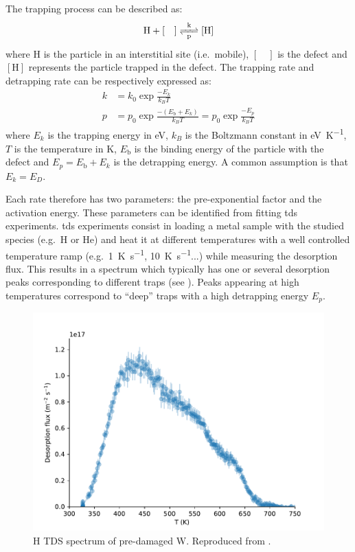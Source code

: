The \gls{trapping} process can be described as:
\begin{equation}
    \ce{H + [\quad] <=>[k][p] [H]}
\end{equation}
where H is the particle in an interstitial site (i.e.\ mobile), $[\quad]$ is the defect and $[\mathrm{H}]$ represents the particle trapped in the defect.
The \gls{trapping} rate and \gls{detrapping} rate can be respectively expressed as:
\begin{align}
    k &= k_0 \exp{\frac{-E_k}{k_B T}} \\
    p &= p_0 \exp{\frac{-(E_\mathrm{b} + E_k)}{k_B T}} = p_0 \exp{\frac{-E_p}{k_B T}}
\end{align}
where $E_k$ is the \gls{trapping} energy in \si{eV}, $k_B$ is the Boltzmann constant in \si{eV.K^{-1}}, $T$ is the temperature in \si{K}, $E_\mathrm{b}$ is the binding energy of the particle with the defect and $E_p = E_\mathrm{b} + E_k$ is the \gls{detrapping} energy.
A common assumption is that $E_k = E_D$.

Each rate therefore has two parameters: the pre-exponential factor and the activation energy.
These parameters can be identified from fitting \gls{tds} experiments.
\gls{tds} experiments consist in loading a metal sample with the studied species (e.g.\ \gls{H} or \gls{He}) and heat it at different temperatures with a well controlled temperature ramp (e.g.\ \SI{1}{K.s^{-1}}, \SI{10}{K.s^{-1}}...) while measuring the desorption flux.
This results in a spectrum which typically has one or several desorption peaks corresponding to different traps (see ).
Peaks appearing at high temperatures correspond to ``deep'' traps with a high \gls{detrapping} energy $E_p$.

\begin{figure}
    \centering
    \includegraphics[width=0.75\linewidth]{Figures/Chapter1/tds_helium_nicolas.pdf}
    \caption{H TDS spectrum of pre-damaged W. Reproduced from \cite{ialovega_hydrogen_2020}.}
\end{figure}

